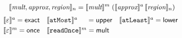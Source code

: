 \begin{align*}
\setlength{\arraycolsep}{0.7em}
& \interp{\textit{mult}, \textit{approx}, \textit{region}}_n
= \interp{\textit{mult}}^m \; (\interp{\textit{approx}}^a \,
\interp{\textit{region}}_n)
\end{align*}
\vspace{-2em}
\setlength{\arraycolsep}{0.3em}
\begin{align*}
& \hspace{-0.5em}\begin{array}{lll}
\llbracket{\varepsilon}\rrbracket^{a}   = \textsf{exact} &
\llbracket{\texttt{atMost}}\rrbracket^{a} \hspace{1.3em} = \textsf{upper} &
\llbracket{\texttt{atLeast}}\rrbracket^{a} = \textsf{lower} \\[0.3em]
\llbracket{\varepsilon}\rrbracket^{m} = \textsf{once}
& \llbracket{\texttt{readOnce}}\rrbracket^{m} = \textsf{mult} &
\end{array}
\end{align*}
%
\vspace{-1em}
